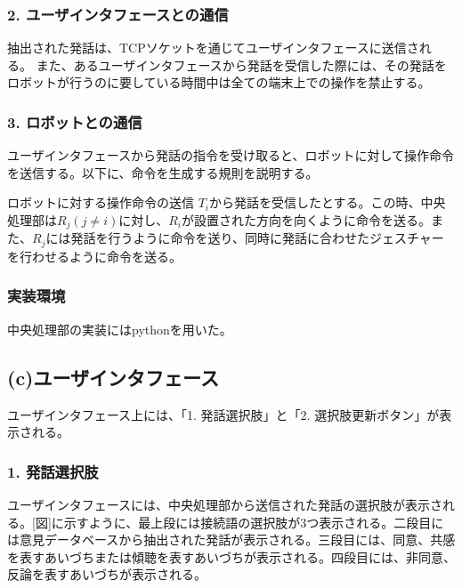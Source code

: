 \documentclass[11pt, a4paper]{jreport} %
\begin{document}
\subsubsection{2. ユーザインタフェースとの通信}
抽出された発話は、TCPソケットを通じてユーザインタフェースに送信される。
また、あるユーザインタフェースから発話を受信した際には、その発話をロボットが行うのに要している時間中は全ての端末上での操作を禁止する。


\subsubsection{3. ロボットとの通信}
ユーザインタフェースから発話の指令を受け取ると、ロボットに対して操作命令を送信する。以下に、命令を生成する規則を説明する。
\begin{itembox}[l]{ロボットに対する操作命令の送信}
$T_i$から発話を受信したとする。この時、中央処理部は$R_j (j \neq i)$に対し、$R_i$が設置された方向を向くように命令を送る。また、$R_j$には発話を行うように命令を送り、同時に発話に合わせたジェスチャーを行わせるように命令を送る。%
\end{itembox}

\subsubsection*{実装環境}
中央処理部の実装にはpythonを用いた。


\subsection*{(c)ユーザインタフェース}
ユーザインタフェース上には、「1. 発話選択肢」と「2. 選択肢更新ボタン」が表示される。
\subsubsection*{1. 発話選択肢}
ユーザインタフェースには、中央処理部から送信された発話の選択肢が表示される。[図]に示すように、最上段には接続語の選択肢が3つ表示される。二段目には意見データベースから抽出された発話が表示される。三段目には、同意、共感を表すあいづちまたは傾聴を表すあいづちが表示される。四段目には、非同意、反論を表すあいづちが表示される。
\end{document}
